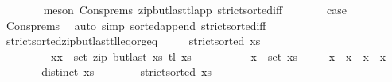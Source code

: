 \begin{isabellebody}
\ \ \ \ \ \ \isamarkupfalse%
\ {\isacharparenleft}{\kern0pt}meson\ Cons{\isachardot}{\kern0pt}prems\ zip{\isacharunderscore}{\kern0pt}butlast{\isacharunderscore}{\kern0pt}tl{\isacharunderscore}{\kern0pt}app\ strict{\isacharunderscore}{\kern0pt}sorted{\isacharunderscore}{\kern0pt}iff{\isacharparenright}{\kern0pt}\isanewline
\ \ \ \ \isamarkupfalse%
\ \isamarkupfalse%
\ {\isacharquery}{\kern0pt}case\isanewline
\ \ \ \ \ \ \isamarkupfalse%
\ Cons{\isachardot}{\kern0pt}prems\ \isamarkupfalse%
\ {\isacharparenleft}{\kern0pt}auto\ simp{\isacharcolon}{\kern0pt}\ sorted{\isacharunderscore}{\kern0pt}append\ strict{\isacharunderscore}{\kern0pt}sorted{\isacharunderscore}{\kern0pt}iff{\isacharparenright}{\kern0pt}\isanewline
\ \ \isamarkupfalse%
%
\endisatagproof
{\isafoldproof}%
%
\isadelimproof
\isanewline
%
\endisadelimproof
\isanewline
\ \ \isamarkupfalse%
\ strict{\isacharunderscore}{\kern0pt}sorted{\isacharunderscore}{\kern0pt}zip{\isacharunderscore}{\kern0pt}butlast{\isacharunderscore}{\kern0pt}tl{\isacharunderscore}{\kern0pt}leq{\isacharunderscore}{\kern0pt}or{\isacharunderscore}{\kern0pt}geq{\isacharcolon}{\kern0pt}\isanewline
\ \ \ \ \ {\isachardoublequoteopen}strict{\isacharunderscore}{\kern0pt}sorted\ xs{\isachardoublequoteclose}\isanewline
\ \ \ \ \ \ \ \ \ {\isachardoublequoteopen}{\isacharparenleft}{\kern0pt}xx\ {\isasymin}\ set\ {\isacharparenleft}{\kern0pt}zip\ {\isacharparenleft}{\kern0pt}butlast\ xs{\isacharparenright}{\kern0pt}\ {\isacharparenleft}{\kern0pt}tl\ xs{\isacharparenright}{\kern0pt}{\isacharparenright}{\kern0pt}{\isachardoublequoteclose}\ \isanewline
\ \ \ \ \ \ \ \ \ {\isachardoublequoteopen}x\ {\isasymin}\ set\ xs{\isachardoublequoteclose}\isanewline
\ \ \ \ \ {\isachardoublequoteopen}x\ {\isasymle}\ x\ {\isasymor}\ x\ {\isasymle}\ x{\isachardoublequoteclose}\isanewline
%
\isadelimproof
\ \ %
\endisadelimproof
%
\isatagproof
{}\isamarkupfalse%
\ {\isacharminus}{\kern0pt}\isanewline
\ \ \ \ \isamarkupfalse%
\ {\isachardoublequoteopen}distinct\ xs{\isachardoublequoteclose}\isanewline
\ \ \ \ \ \ \isamarkupfalse%
\ {\isacartoucheopen}strict{\isacharunderscore}{\kern0pt}sorted\ xs{\isacartoucheclose}\ \isamarkupfalse%

\end{isabellebody}
